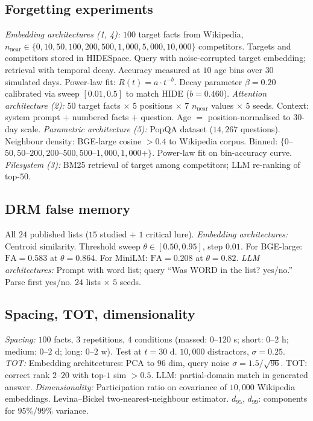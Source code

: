 \documentclass[11pt]{article}
\begin{document}
\subsection*{Forgetting experiments}

\textit{Embedding architectures (1, 4):} $100$ target facts from Wikipedia, $n_\text{near} \in \{0, 10, 50, 100, 200, 500, 1{,}000, 5{,}000, 10{,}000\}$ competitors. Targets and competitors stored in HIDESpace. Query with noise-corrupted target embedding; retrieval with temporal decay. Accuracy measured at $10$ age bins over $30$ simulated days. Power-law fit: $R(t) = a \cdot t^{-b}$\cite{shannon1948}. Decay parameter $\beta = 0.20$ calibrated via sweep $[0.01, 0.5]$ to match HIDE ($b = 0.460$). \textit{Attention architecture (2):} $50$ target facts $\times$ $5$ positions $\times$ $7$ $n_\text{near}$ values $\times$ $5$ seeds. Context: system prompt $+$ numbered facts $+$ question. Age $=$ position-normalised to $30$-day scale. \textit{Parametric architecture (5):} PopQA dataset\cite{popqa} ($14{,}267$ questions). Neighbour density: BGE-large cosine $> 0.4$ to Wikipedia corpus. Binned: $\{0$--$50, 50$--$200, 200$--$500, 500$--$1{,}000, 1{,}000+\}$. Power-law fit on bin-accuracy curve. \textit{Filesystem (3):} BM25 retrieval of target among competitors; LLM re-ranking of top-$50$.

\subsection*{DRM false memory}

All $24$ published lists\cite{roediger1995} ($15$ studied $+$ $1$ critical lure). \textit{Embedding architectures:} Centroid similarity. Threshold sweep $\theta \in [0.50, 0.95]$, step $0.01$. For BGE-large: $\text{FA} = 0.583$ at $\theta = 0.864$. For MiniLM: $\text{FA} = 0.208$ at $\theta = 0.82$. \textit{LLM architectures:} Prompt with word list; query ``Was WORD in the list? yes/no.'' Parse first yes/no. $24$ lists $\times$ $5$ seeds.

\subsection*{Spacing, TOT, dimensionality}

\textit{Spacing:} $100$ facts, $3$ repetitions, $4$ conditions (massed: $0$--$120$ s; short: $0$--$2$ h; medium: $0$--$2$ d; long: $0$--$2$ w). Test at $t = 30$ d. $10{,}000$ distractors, $\sigma = 0.25$. \textit{TOT:} Embedding architectures: PCA to $96$ dim, query noise $\sigma = 1.5/\sqrt{96}$. TOT: correct rank $2$--$20$ with top-$1$ sim $> 0.5$. LLM: partial-domain match in generated answer. \textit{Dimensionality:} Participation ratio on covariance of $10{,}000$ Wikipedia embeddings. Levina--Bickel two-nearest-neighbour estimator\cite{levina2005}. $d_{95}$, $d_{99}$: components for $95\%$/$99\%$ variance.
\end{document}
